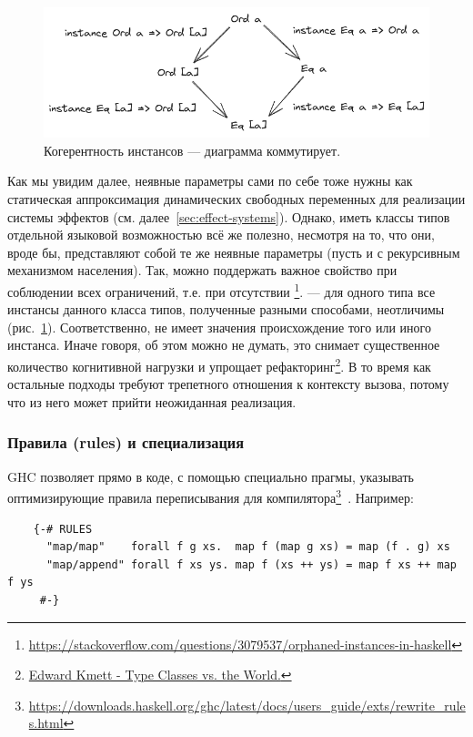 \begin{figure}
    \centering
    \includegraphics[width=0.8\linewidth]{figs/coherence}
    \caption{Когерентность инстансов --- диаграмма коммутирует.}
    \label{fig:coherence}
\end{figure}

Как мы увидим далее, неявные параметры сами по себе тоже нужны как статическая аппроксимация динамических свободных переменных для реализации системы эффектов (см. далее~\ref{sec:effect-systems}).
Однако, иметь классы типов отдельной языковой возможностью всё же полезно, несмотря на то, что они, вроде бы, представляют собой те же неявные параметры (пусть и с рекурсивным механизмом населения).
Так, можно поддержать важное свойство при соблюдении всех ограничений, т.е. при отсутствии \footnote{\url{https://stackoverflow.com/questions/3079537/orphaned-instances-in-haskell}}.
 --- для одного типа все инстансы данного класса типов, полученные разными способами, неотличимы (рис.~\ref{fig:coherence}).
Соответственно, не имеет значения происхождение того или иного инстанса.
Иначе говоря, об этом можно не думать, это снимает существенное количество когнитивной нагрузки и упрощает рефакторинг\footnote{\href{https://youtu.be/hIZxTQP1ifo?si=aG2Lk2eb-5E5SOLb}{Edward Kmett - Type Classes vs. the World.}}.
В то время как остальные подходы требуют трепетного отношения к контексту вызова, потому что из него может прийти неожиданная реализация.

\subsubsection{Правила (rules) и специализация} \label{subsubsec:rules}

GHC позволяет прямо в коде, с помощью специально прагмы, указывать оптимизирующие правила переписывания для компилятора\footnote{\url{https://downloads.haskell.org/ghc/latest/docs/users_guide/exts/rewrite_rules.html}}~\cite{jones2001playing}.
Например:
\begin{verbatim}
    {-# RULES
      "map/map"    forall f g xs.  map f (map g xs) = map (f . g) xs
      "map/append" forall f xs ys. map f (xs ++ ys) = map f xs ++ map f ys
     #-}
\end{verbatim}

